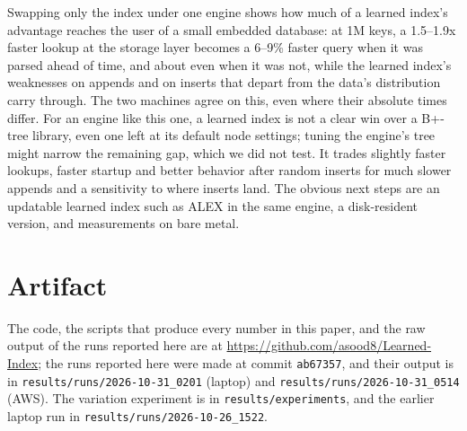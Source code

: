 \documentclass[conference]{IEEEtran}
\begin{document}
Swapping only the index under one engine shows how much of a learned
index's advantage reaches the user of a small embedded database: at 1M keys, a
1.5--1.9x faster lookup at the storage layer becomes a 6--9\% faster query when it
was parsed ahead of time, and about even when it was not, while the learned index's
weaknesses on appends and on inserts that depart from the data's distribution
carry through. The two machines agree on this, even where their absolute times
differ. For an engine like this one, a learned index is not a clear win over a
B+-tree library, even one left at its default node settings; tuning the engine's
tree might narrow the remaining gap, which we did not test. It trades slightly faster lookups, faster startup and better
behavior after random inserts for much slower appends and a sensitivity to where
inserts land. The obvious next steps are an updatable learned index such as ALEX
in the same engine, a disk-resident version, and measurements on bare metal.

\section*{Artifact}

The code, the scripts that produce every number in this paper, and the raw
output of the runs reported here are at
\url{https://github.com/asood8/Learned-Index}; the runs reported here
were made at commit \texttt{ab67357}, and their output is in
\texttt{results/runs/2026-10-31\_0201} (laptop) and
\texttt{results/runs/2026-10-31\_0514} (AWS). The variation experiment is in
\texttt{results/experiments}, and the earlier laptop run in
\texttt{results/runs/2026-10-26\_1522}.



\end{document}
